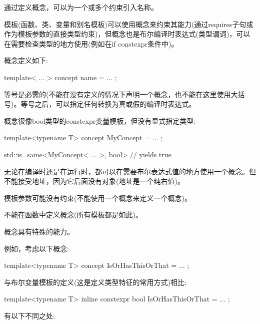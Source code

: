 
通过定义概念，可以为一个或多个约束引入名称。

模板(函数、类、变量和别名模板)可以使用概念来约束其能力(通过requires子句或作为模板参数的直接类型约束)，但概念也是布尔编译时表达式(类型谓词)，可以在需要检查类型的地方使用(例如在if constexpr条件中)。


概念定义如下:

\begin{cpp}
template< ... >
concept name = ... ;
\end{cpp}

等号是必需的(不能在没有定义的情况下声明一个概念，也不能在这里使用大括号)。等号之后，可以指定任何转换为真或假的编译时表达式。

概念很像bool类型的constexpr变量模板，但没有显式指定类型:

\begin{cpp}
template<typename T>
concept MyConcept = ... ;

std::is_same<MyConcept< ... >, bool> // yields true
\end{cpp}

无论在编译时还是在运行时，都可以在需要布尔表达式值的地方使用一个概念。但不能接受地址，因为它后面没有对象(地址是一个纯右值)。

模板参数可能没有约束(不能使用一个概念来定义一个概念)。

不能在函数中定义概念(所有模板都是如此)。


概念具有特殊的能力。

例如，考虑以下概念:

\begin{cpp}
template<typename T>
concept IsOrHasThisOrThat = ... ;
\end{cpp}

与布尔变量模板的定义(这是定义类型特征的常用方式)相比:

\begin{cpp}
template<typename T>
inline constexpr bool IsOrHasThisOrThat = ... ;
\end{cpp}

有以下不同之处:

